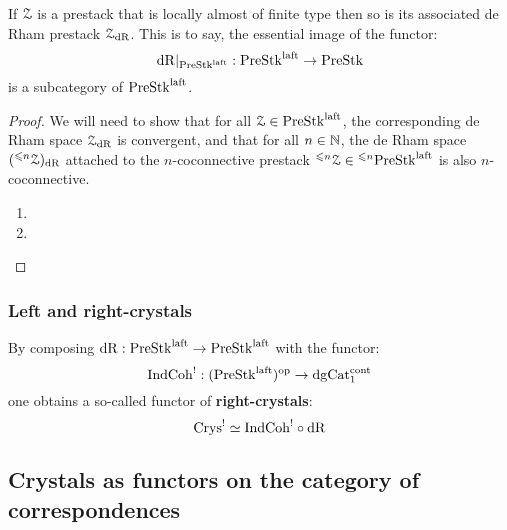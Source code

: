                 \begin{proposition} \label{prop: laft_de_rham_spaces}
                    If $\mathcal{Z}$ is a prestack that is locally almost of finite type then so is its associated de Rham prestack $\mathcal{Z}_{\mathrm{dR}}$. This is to say, the essential image of the functor:
                        $$\mathrm{dR}|_{\mathrm{Pre}\mathrm{Stk}^{\mathrm{laft}}}: \mathrm{Pre}\mathrm{Stk}^{\mathrm{laft}} \to \mathrm{Pre}\mathrm{Stk}$$
                    is a subcategory of $\mathrm{Pre}\mathrm{Stk}^{\mathrm{laft}}$.
                \end{proposition}
                    \begin{proof}
                        We will need to show that for all $\mathcal{Z} \in \mathrm{Pre}\mathrm{Stk}^{\mathrm{laft}}$, the corresponding de Rham space $\mathcal{Z}_{\mathrm{dR}}$ is convergent, and that for all $n \in \mathbb{N}$, the de Rham space $({}^{\leqslant n}\mathcal{Z})_{\mathrm{dR}}$ attached to the $n$-coconnective prestack ${}^{\leqslant n}\mathcal{Z} \in {}^{\leqslant n}\mathrm{Pre}\mathrm{Stk}^{\mathrm{laft}}$ is also $n$-coconnective.
                            \begin{enumerate}
                                \item 
                                \item 
                            \end{enumerate}
                    \end{proof}
                
                \begin{remark} \label{remark: universal_property_of_de_rham_spaces}
                    
                \end{remark}
                    
            \subsubsection{Left and right-crystals}
                \begin{definition} \label{def: right-crystals}
                    By composing $\mathrm{dR}: \mathrm{Pre}\mathrm{Stk}^{\mathrm{laft}} \to \mathrm{Pre}\mathrm{Stk}^{\mathrm{laft}}$ with the functor:
                        $$\mathrm{Ind}\mathrm{Coh}^!: (\mathrm{Pre}\mathrm{Stk}^{\mathrm{laft}})^{\mathrm{op}} \to \mathrm{dg}\mathrm{Cat}^{\mathrm{cont}}_1$$
                    one obtains a so-called functor of \textbf{right-crystals}:
                        $$\mathrm{Crys}^! \simeq \mathrm{Ind}\mathrm{Coh}^! \circ \mathrm{dR}$$
                \end{definition}
        
        \subsection{Crystals as functors on the category of correspondences}
        

